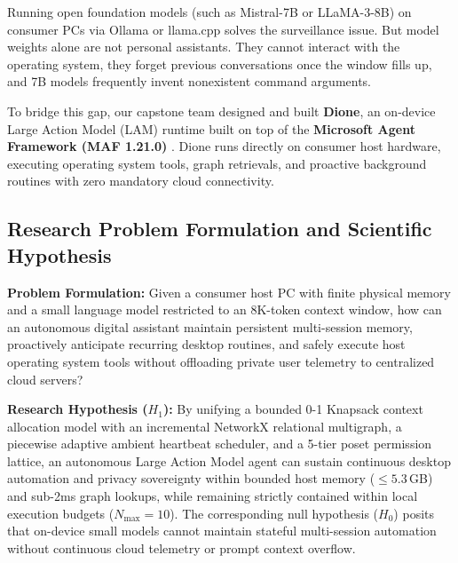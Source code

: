 \documentclass[conference,a4paper]{IEEEtran}
\begin{document}
Running open foundation models (such as Mistral-7B or LLaMA-3-8B) on consumer PCs via Ollama or llama.cpp solves the surveillance issue. But model weights alone are not personal assistants. They cannot interact with the operating system, they forget previous conversations once the window fills up, and 7B models frequently invent nonexistent command arguments.

To bridge this gap, our capstone team designed and built \textbf{Dione}, an on-device Large Action Model (LAM) runtime built on top of the \textbf{Microsoft Agent Framework (MAF 1.21.0)} \cite{microsoft2025agentframework}. Dione runs directly on consumer host hardware, executing operating system tools, graph retrievals, and proactive background routines with zero mandatory cloud connectivity.

\subsection{Research Problem Formulation and Scientific Hypothesis}
\textbf{Problem Formulation:} Given a consumer host PC with finite physical memory and a small language model restricted to an 8K-token context window, how can an autonomous digital assistant maintain persistent multi-session memory, proactively anticipate recurring desktop routines, and safely execute host operating system tools without offloading private user telemetry to centralized cloud servers?

\textbf{Research Hypothesis ($H_1$):} By unifying a bounded 0-1 Knapsack context allocation model with an incremental NetworkX relational multigraph, a piecewise adaptive ambient heartbeat scheduler, and a 5-tier poset permission lattice, an autonomous Large Action Model agent can sustain continuous desktop automation and privacy sovereignty within bounded host memory ($\le 5.3$\,GB) and sub-2ms graph lookups, while remaining strictly contained within local execution budgets ($N_{\text{max}} = 10$). The corresponding null hypothesis ($H_0$) posits that on-device small models cannot maintain stateful multi-session automation without continuous cloud telemetry or prompt context overflow.
\end{document}
